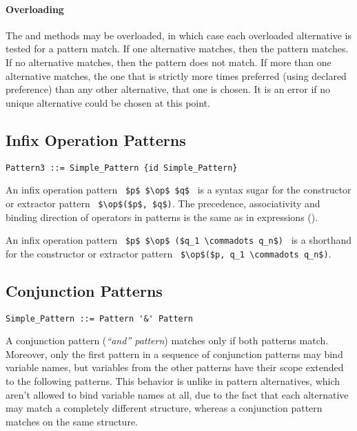 \paragraph{Overloading}
The  and  methods may be overloaded, in which case each overloaded alternative is tested for a pattern match. If one alternative matches, then the pattern matches. If no alternative matches, then the pattern does not match. If more than one alternative matches, the one that is strictly more times preferred (using declared preference) than any other alternative, that one is chosen. It is an error if no unique alternative could be chosen at this point. 






\subsection{Infix Operation Patterns}
\label{sec:infix-operation-patterns}

\syntax\begin{lstlisting}
Pattern3 ::= Simple_Pattern {id Simple_Pattern}
\end{lstlisting}

An infix operation pattern ~\lstinline!$p$ $\op$ $q$!~ is a syntax sugar for the constructor or extractor pattern ~\lstinline!$\op$($p$, $q$)!. The precedence, associativity and binding direction of operators in patterns is the same as in expressions ().

An infix operation pattern ~\lstinline!$p$ $\op$ ($q_1 \commadots q_n$)!~ is a shorthand for the constructor or extractor pattern ~\lstinline!$\op$($p, q_1 \commadots q_n$)!.





\subsection{Conjunction Patterns}
\label{sec:conjunction-patterns}

\syntax\begin{lstlisting}
Simple_Pattern ::= Pattern '&' Pattern
\end{lstlisting}

A conjunction pattern ({\em {\normalfont ``and''} pattern}) matches only if both patterns match. Moreover, only the first pattern in a sequence of conjunction patterns may bind variable names, but variables from the other patterns have their scope extended to the following patterns. This behavior is unlike in pattern alternatives, which aren't allowed to bind variable names at all, due to the fact that each alternative may match a completely different structure, whereas a conjunction pattern matches on the same structure. 





